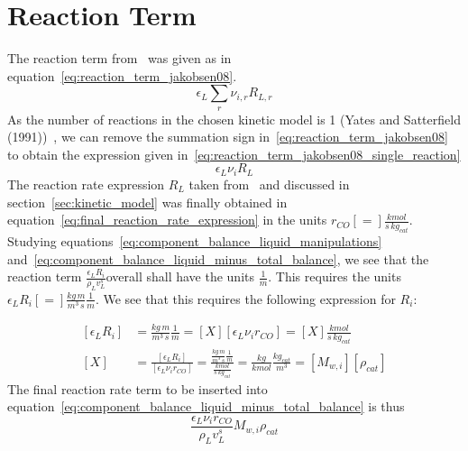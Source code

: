 \documentclass{article}
\begin{document}
\section{Reaction Term}
The reaction term from~\cite{Jakobsen08} was given as in equation~\ref{eq:reaction_term_jakobsen08}. 
\begin{equation}
	\epsilon_L \sum_r\nu_{i,r}R_{L,r} 
	\label{eq:reaction_term_jakobsen08}
\end{equation}
As the number of reactions in the chosen kinetic model is 1 (Yates and Satterfield (1991))~\cite{Yates1991}, we can remove the summation sign in~\ref{eq:reaction_term_jakobsen08} to obtain the expression given in~\ref{eq:reaction_term_jakobsen08_single_reaction}
\begin{equation}
	\epsilon_L \nu_{i}R_{L} 
	\label{eq:reaction_term_jakobsen08_single_reaction}
\end{equation}
The reaction rate expression $R_L$ taken from~\cite{Yates1991} and discussed in section~\ref{sec:kinetic_model} was finally obtained in equation~\ref{eq:final_reaction_rate_expression} in the units $r_{CO}[=]\frac{kmol}{s\, kg_{cat}}$. Studying equations~\ref{eq:component_balance_liquid_manipulations} and~\ref{eq:component_balance_liquid_minus_total_balance}, we see that the reaction term $\frac{\epsilon_L R_i}{\rho_L v_L^s}$overall shall have the units $\frac{1}{m}$. This requires the units $\epsilon_LR_i[=]\frac{kg \, m}{m^3\, s}\frac{1}{m}$. We see that this requires the following expression for $R_i$:

\begin{equation}
	\begin{split}
	[\epsilon_L R_i]&= \frac{kg \, m}{m^3\, s}\frac{1}{m} = [X][\epsilon_L\nu_ir_{CO}]= [X]\frac{kmol}{s\, kg_{cat}}\\
	[X]&=\frac{[\epsilon_L R_i]}{[\epsilon_L\nu_i r_{CO}]}= \frac{\frac{kg \, m}{m^3\, s}\frac{1}{m}}{\frac{kmol}{s\, kg_{cat}}} = \frac{kg}{kmol}\frac{kg_{cat}}{m^3}=[M_{w,i}][\rho_{cat}]
	\end{split}
\end{equation}
The final reaction rate term to be inserted into equation~\ref{eq:component_balance_liquid_minus_total_balance} is thus
\begin{equation}
	\frac{\epsilon_L \nu_i r_{CO}}{\rho_L v_L^s}M_{w,i}\rho_{cat}
\end{equation}
\end{document}
